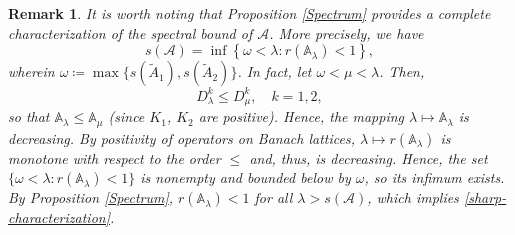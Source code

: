 \documentclass[a4paper,11pt,reqno]{amsart}
\def\A{{\mathbb{A}}}
\theoremstyle{plain}
\newtheorem{remark}{Remark}[section]
\numberwithin{equation}{section}
\begin{document}
\begin{remark}\label{rem.chara}
It is worth noting that Proposition \ref{Spectrum} provides a complete characterization of the spectral bound of $\mathcal{A}$. More precisely, we have
\begin{equation}\label{sharp-characterization}
s(\mathcal{A})=\inf\left\{\omega<\lambda: r(\A_\lambda)<1\right\},
\end{equation}
wherein $\omega \coloneqq\max\big\{s(\tilde{A}_1), s(\tilde{A}_2)\big\}$. In fact, let $\omega<\mu<\lambda$. Then,
\begin{equation*}
D_\lambda^k\le D_\mu^k,\quad k=1,2,
\end{equation*}
so that $\mathbb{A}_\lambda\le \mathbb{A}_\mu$ (since $K_1$, $K_2$ are positive). Hence, the mapping $\lambda \mapsto \mathbb{A}_\lambda$ is decreasing. By positivity of operators on Banach lattices, $\lambda \mapsto r(\mathbb{A}_\lambda)$ is monotone with respect to the order $\le$ and, thus, is decreasing. Hence, the set $\{\omega<\lambda:r(\A_\lambda)<1\}$ is nonempty and bounded below by $\omega$, so its infimum exists. By Proposition \ref{Spectrum}, $r(\A_\lambda)<1$ for all $\lambda>s(\mathcal{A})$, which implies \eqref{sharp-characterization}.
\end{remark}
\end{document}
